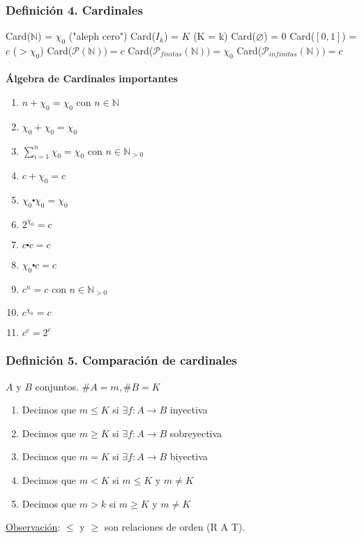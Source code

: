 \documentclass{article}
\newcommand{\naturales}{\mathbb{N}}                     %
\newcommand{\partes}{\mathcal{P}}
\newcommand{\sumatoria}[2]{\sum_{#1} ^{#2}}
\begin{document}
\subsubsection*{Definición 4. Cardinales}
Card($\naturales$) = $\chi_0$ ("aleph cero")
\newline Card($I_k$) = $K$ (K = k)
\newline Card($\varnothing$) = $0$
\newline Card($[0,1]$) = $c$ ($> \chi_0$) 
\newline Card($\partes(\naturales)) = c$
\newline Card($\partes_{finitas}(\naturales)) = \chi_0$
\newline Card($\partes_{infinitas}(\naturales)) = c$
\\\\\textbf{Álgebra de Cardinales importantes}
\begin{enumerate}
    \item $n + \chi_0 = \chi_0$ con $n \in \naturales$
    \item $\chi_0 + \chi_0 = \chi_0$
    \item $\sumatoria{i=1}{n} \chi_0 = \chi_0$ con $n \in \naturales_{>0}$
    \item $c + \chi_0 = c$
    \item $\chi_0 \centerdot \chi_0 = \chi_0$
    \item $2^{\chi_0} = c$
    \item $c \centerdot c = c$
    \item $\chi_0 \centerdot c = c$
    \item $c^n = c$ con $n \in \naturales_{>0}$
    \item $c^{\chi_0} = c$
    \item $c^c = 2^c$
\end{enumerate}

\subsubsection*{Definición 5. Comparación de cardinales}
$A$ y $B$ conjuntos. $\#A = m,  \#B = K$
\begin{enumerate}
    \item Decimos que $m \leq K$ si $\exists f: A \rightarrow B$ inyectiva
    \item Decimos que $m \geq K$ si $\exists f: A \rightarrow B$ sobreyectiva
    \item Decimos que $m = K$ si $\exists f: A \rightarrow B$ biyectiva
    \item Decimos que $m < K$ si $m \leq K$ y $m \neq K$
    \item Decimos que $m > k$ si $m \geq K$ y $m \neq K$
\end{enumerate}
\underline{Observación}: $\leq$ y $\geq$ son relaciones de orden (R A T).
\end{document}
